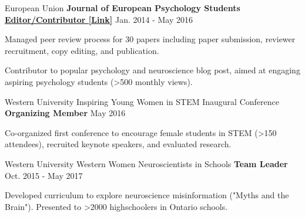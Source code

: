 \begin{cventries}
\begin{cventries}
  \cventry
    {European Union}
    {\textbf{Journal of European Psychology Students}} %
    {\href{https://blog.efpsa.org/2015/09/22/editors-pick-our-favourite-psychology-and-neuroscience-podcasts}{\textbf{Editor/Contributor [Link]}}} %
    {Jan. 2014 - May 2016} %
    {
      \begin{cvitems} %
      	\item {Managed peer review process for 30 papers including paper submission, reviewer recruitment, copy editing, and publication.}
        \item {Contributor to popular psychology and neuroscience blog post, aimed at engaging aspiring psychology students (>500 monthly views).}
      \end{cvitems}
    }

\end{cventries}
    

\begin{cventries}
    
  \cventry
    {Western University} %
    {Inspiring Young Women in STEM Inaugural Conference}
    {\textbf{Organizing Member}} %
    {May 2016} %
    {
      \begin{cvitems} %
        \item {Co-organized first conference to encourage female students in STEM (>150 attendees), recruited keynote speakers, and evaluated research.}
      \end{cvitems}
    }
    
  \cventry
    {Western University}
    {Western Women Neuroscientists in Schools}
  	{\textbf{Team Leader}} %
    {Oct. 2015 - May 2017} %
    {
      \begin{cvitems} %
        \item {Developed curriculum to explore neuroscience misinformation ("Myths and the Brain"). Presented to >2000 highschoolers in Ontario schools.}
      \end{cvitems}
    }
    
    

\end{cventries}
\end{cventries}
